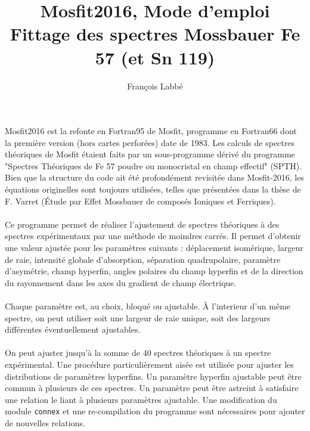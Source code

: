 \documentclass[a4paper]{article}
\begin{document}
\title{Mosfit2016, Mode d'emploi \\Fittage des spectres Mossbauer Fe 57 (et Sn 119)}
\author{Fran\c{c}ois Labb\'e}
\maketitle

\paragraph{}
Mosfit2016 est la refonte en Fortran95 de Mosfit, programme en Fortran66 dont la première version (hors cartes perforées) date de 1983.
Les calculs de spectres théoriques de Mosfit étaient faits par un sous-programme dérivé du programme "Spectres Théoriques de Fe 57 poudre ou monocristal en champ effectif" (SPTH). 
Bien que la structure du code ait été profondément revisitée dans Mosfit-2016, les équations originelles sont toujours utilisées, telles que présentées dans la thèse de F. Varret (\'Etude par Effet Mossbauer de composés Ioniques et Ferriques).


\paragraph{}
Ce programme permet de réaliser l'ajustement de spectres théoriques à des spectres expérimentaux par une méthode de moindres carrés.
Il permet d'obtenir une valeur ajustée pour les paramètres suivants : déplacement isomérique, largeur de raie, intensité globale d'absorption, 
séparation quadrupolaire, paramètre d'asymétrie, champ hyperfin, angles polaires du champ hyperfin et de la direction du rayonnement dans les axes du gradient de champ électrique.

\paragraph{}
Chaque paramètre est, au choix, bloqué ou ajustable.
 À l'interieur d'un même spectre, on peut utiliser soit une largeur de raie unique, soit des largeurs différentes éventuellement ajustables. 

\paragraph{}
On peut ajuster jusqu'à la somme de 40 spectres théoriques à un spectre expérimental.
 Une procédure particulièrement aisée est utilisée pour ajuster les distributions de paramètres hyperfins.
 Un paramètre hyperfin ajustable peut être commun à plusieurs de ces spectres.
 Un paramètre peut être astreint à satisfaire une relation le liant à plusieurs paramètres ajustable.
 Une modification du module \lstinline{connex} et une re-compilation du programme sont nécessaires pour ajouter de nouvelles relations.
 
\end{document}
